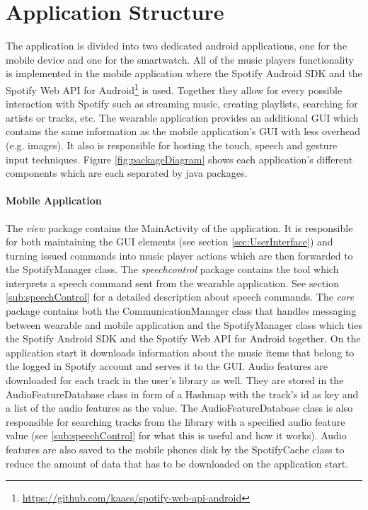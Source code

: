 \section{Application Structure}\label{sec:ApplicationStructure}
The application is divided into two dedicated android applications, one for the mobile device and one for the smartwatch. All of the music players functionality is implemented in the mobile application where the Spotify Android \ac{SDK} and the Spotify Web \ac{API} for Android\footnote{\url{https://github.com/kaaes/spotify-web-api-android}} is used. Together they allow for every possible interaction with Spotify such as streaming music, creating playlists, searching for artists or tracks, etc. The wearable application provides an additional \ac{GUI} which contains the same information as the mobile application's \ac{GUI} with less overhead (e.g. images). It also is responsible for hosting the touch, speech and gesture input techniques. Figure \ref{fig:packageDiagram} shows each application's different components which are each separated by java packages.

\paragraph{Mobile Application}
The \textit{view} package contains the MainActivity of the application. It is responsible for both maintaining the \ac{GUI} elements (see section \ref{sec:UserInterface}) and turning issued commands into music player actions which are then forwarded to the SpotifyManager class. The \textit{speechcontrol} package contains the tool which interprets a speech command sent from the wearable application. See section \ref{sub:speechControl} for a detailed description about speech commands. The \textit{core} package contains both the CommunicationManager class that handles messaging between wearable and mobile application and the SpotifyManager class which ties the Spotify Android \ac{SDK} and the Spotify Web \ac{API} for Android together. On the application start it downloads information about the music items that belong to the logged in Spotify account and serves it to the \ac{GUI}. Audio features are downloaded for each track in the user's library as well. They are stored in the AudioFeatureDatabase class in form of a Hashmap with the track's id as key and a list of the audio features as the value. The AudioFeatureDatabase class is also responsible for searching tracks from the library with a specified audio feature value (see \ref{sub:speechControl} for what this is useful and how it works). Audio features are also saved to the mobile phones disk by the SpotifyCache class to reduce the amount of data that has to be downloaded on the application start.


